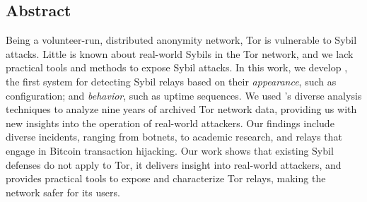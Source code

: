 \subsection*{Abstract}
Being a volunteer-run, distributed anonymity network, Tor is vulnerable to Sybil
attacks.  Little is known about real-world Sybils in the Tor network, and we
lack practical tools and methods to expose Sybil attacks.
%
In this work, we develop \sys, the first system for detecting Sybil relays based
on their \emph{appearance}, such as configuration; and \emph{behavior}, such as
uptime sequences.  We used \sys's diverse analysis techniques to analyze nine
years of archived Tor network data, providing us with new insights into the
operation of real-world attackers.  Our findings include diverse incidents,
ranging from botnets, to academic research, and relays that engage in Bitcoin
transaction hijacking.
%
Our work shows that existing Sybil defenses do not apply to Tor, it delivers
insight into real-world attackers, and provides practical tools to expose and
characterize Tor relays, making the network safer for its users.
